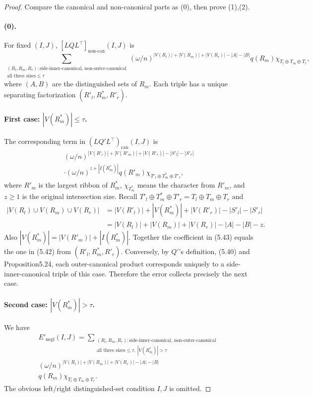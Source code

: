 \documentclass[10pt,a4paper]{article}
\begin{document}
\begin{proof}Compare the canonical and non-canonical parts as (0), then prove (1),(2).
\paragraph{(0).} For fixed $(I,J)$, $[LQL^\top]_{\mathrm{non\text{-}can}}(I,J)$ is
\[\sum_{\substack{(R_l,R_m,R_r):\text{side-inner-canonical, non-outer-canonical}\\\text{all three sizes}\le\tau}}(\omega/n)^{|V(R_l)|+|V(R_m)|+|V(R_r)|-|A|-|B|}q(R_m)\chi_{T_l\oplus T_m\oplus T_r},\tag{5.42}\]
where $(A,B)$ are the distinguished sets of $R_m$. Each triple has a unique separating factorization $(R'_l,R^*_m,R'_r)$.
\paragraph{First case: $|V(R^*_m)|\le\tau$.} The corresponding term in $(LQ'L^\top)_{\mathrm{can}}(I,J)$ is
\begin{multline*}(\omega/n)^{|V(R'_l)|+|V(R'_m)|+|V(R'_r)|-|S'_l|-|S'_r|}\\\cdot(\omega/n)^{z+|I(R^*_m)|}q(R'_m)\chi_{T'_l\oplus T^*_m\oplus T'_r},\tag{5.43}\end{multline*}
where $R'_m$ is the largest ribbon of $R^*_m$, $\chi_{T^*_m}$ means the character from $R'_m$, and $z\ge1$ is the original intersection size. Recall $T'_l\oplus T^*_m\oplus T'_r=T_l\oplus T_m\oplus T_r$ and
\begin{align*}|V(R_l)\cup V(R_m)\cup V(R_r)|&=|V(R'_l)|+|V(R^*_m)|+|V(R'_r)|-|S'_l|-|S'_r|\\&=|V(R_l)|+|V(R_m)|+|V(R_r)|-|A|-|B|-z.\end{align*}
Also $|V(R^*_m)|=|V(R'_m)|+|I(R^*_m)|$. Together the coefficient in (5.43) equals the one in (5.42) from $(R'_l,R^*_m,R'_r)$. Conversely, by $Q'$'s definition, (5.40) and Proposition5.24, each outer-canonical product corresponds uniquely to a side-inner-canonical triple of this case. Therefore the error collects precisely the next case.
\paragraph{Second case: $|V(R^*_m)|>\tau$.} We have
\begin{multline*}E'_{\mathrm{negl}}(I,J)=\sum_{\substack{(R_l,R_m,R_r):\text{side-inner-canonical, non-outer-canonical}\\\text{all three sizes}\le\tau,\ |V(R^*_m)|>\tau}}\\
(\omega/n)^{|V(R_l)|+|V(R_m)|+|V(R_r)|-|A|-|B|}\\
q(R_m)\chi_{T_l\oplus T_m\oplus T_r}.\tag{5.44}\end{multline*}
The obvious left/right distinguished-set condition $I,J$ is omitted.

\end{proof}
\end{document}
